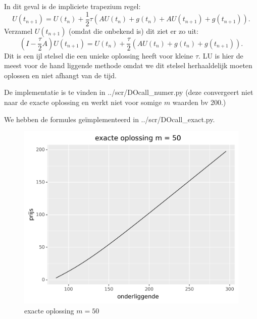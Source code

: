 \documentclass{article}
\begin{document}
In dit geval is de impliciete trapezium regel:
\[
  U(t_{n+1}) = U(t_{n}) + \frac{1}{2} \tau (A U(t_{n}) + g(t_{n}) + A U(t_{n+1}) + g(t_{n+1}))
.\]
Verzamel $U(t_{n+1})$ (omdat die onbekend is) dit ziet er zo uit:
\[
  (I-\frac{\tau}{2}A)U(t_{n+1}) = U(t_{n}) + \frac{\tau}{2} (AU(t_{n}) + g(t_{n})+ g(t_{n+1}))
.\]
Dit is een ijl stelsel die een unieke oplossing heeft voor kleine $\tau$.
LU is hier de meest voor de hand liggende methode omdat we dit stelsel
herhaaldelijk moeten oplossen en niet afhangt van de tijd.

De implementatie is te vinden in ../scr/DOcall_numer.py (deze convergeert niet
naar de exacte oplossing en werkt niet voor somige $m$ waarden bv 200.) 

We hebben de formules geïmplementeerd in ../scr/DOcall\_exact.py.

\begin{figure}
\includegraphics[width=\linewidth]{oefening6.png}
\caption{exacte oplossing $m = 50$ }\label{fig:opl50}
\end{figure}
\end{document}
